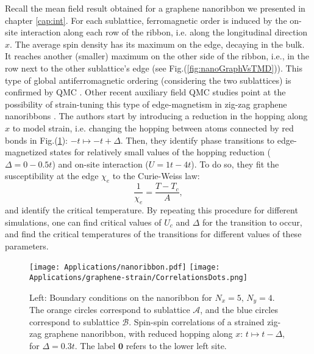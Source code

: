 Recall the mean field result obtained for a graphene nanoribbon we presented in chapter \ref{cap:int}.
For each sublattice, ferromagnetic order is induced by the on-site interaction along each row of the ribbon, i.e. along the longitudinal direction $x$.
The average spin density has its maximum on the edge, decaying in the bulk.
It reaches another (smaller) maximum on the other side of the ribbon, i.e., in the row next to the other sublattice's edge (see Fig.(\ref{fig:nanoGraphVsTMD})).
This type of global antiferromagnetic ordering (considering the two sublattices) is confirmed by \ac{QMC} \cite{feldner_dynamical_2011, raczkowski_interplay_2017}.
Other recent auxiliary field \ac{QMC} studies point at the possibility of strain-tuning this type of edge-magnetism in zig-zag graphene nanoribbons \cite{yang_strain-tuning_2017}.
The authors start by introducing a reduction in the hopping along $x$ to model strain, i.e. changing the hopping between atoms connected by red bonds in Fig.(\ref{fig:bcRibbon}): $-t \mapsto -t + \Delta$.
Then, they identify phase transitions to edge-magnetized states for relatively small values of the hopping reduction ($\Delta = 0-0.5t$) and on-site interaction ($U = 1 t- 4t$).
To do so, they fit the susceptibility at the edge $\chi_e$ to the Curie-Weiss law:
\begin{equation}
\frac{1}{\chi_e} = \frac{T - T_c}{A} ,
\end{equation}
and identify the critical temperature.
By repeating this procedure for different simulations, one can find critical values of $U_c$ and $\Delta$ for the transition to occur, and find the critical temperatures of the transitions for different values of these parameters.

\begin{figure}[H]
\hspace{-0.8cm}
\texttt{[image: Applications/nanoribbon.pdf]}
\texttt{[image: Applications/graphene-strain/CorrelationsDots.png]}
	\caption[Boundary conditions on the nanoribbon. Spin-spin correlations of a strained zig-zag graphene nanoribbon.]{Left: Boundary conditions on the nanoribbon for $N_x = 5, \, N_y = 4$. The orange circles correspond to sublattice $\mathcal{A}$, and the blue circles correspond to sublattice $\mathcal{B}$.
	Spin-spin correlations of a strained zig-zag graphene nanoribbon, with reduced hopping along $x$: $t \mapsto t - \Delta$, for $\Delta = 0.3t$. The label $\bm 0$ refers to the lower left site.
}
	\label{fig:bcRibbon}
\end{figure}

